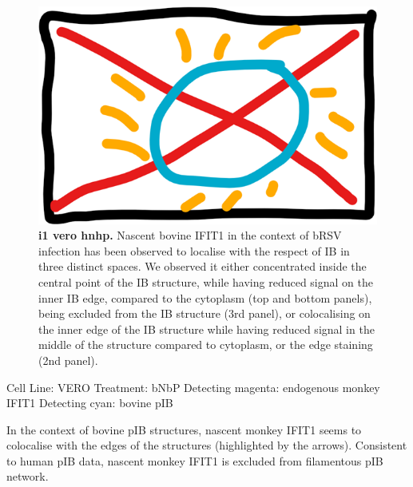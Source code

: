 \begin{figure}
    \centering
    \includegraphics[width=1\linewidth]{09. Chapter 4/Figs/00. placeholder.png}
    \caption[i1 vero hnhp]{\textbf{i1 vero hnhp.} Nascent bovine IFIT1 in the context of bRSV infection has been observed to localise with the respect of IB in three distinct spaces. We observed it either concentrated inside the central point of the IB structure, while having reduced signal on the inner IB edge, compared to the cytoplasm (top and bottom panels), being excluded from the IB structure (3rd panel), or colocalising on the inner edge of the IB structure while having reduced signal in the middle of the structure compared to cytoplasm, or the edge staining (2nd panel).}
    \label{fig:i3 a549 hrsv}
\end{figure}

Cell Line: VERO \newline
Treatment: bNbP \newline
Detecting magenta: endogenous monkey IFIT1 \newline
Detecting cyan: bovine pIB \newline

In the context of bovine pIB structures, nascent monkey IFIT1 seems to colocalise with the edges of the structures (highlighted by the arrows). Consistent to human pIB data, nascent monkey IFIT1 is excluded from filamentous pIB network.


